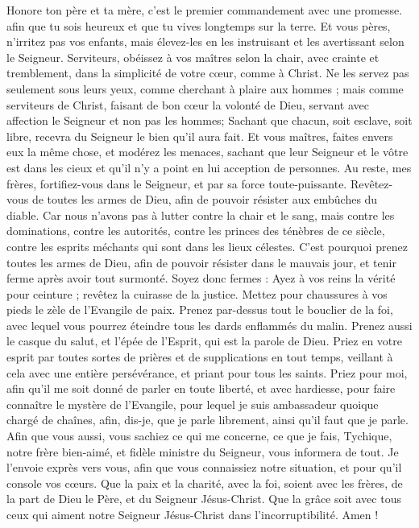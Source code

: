 \begin{multicols}{2}
Honore ton père et ta mère, c'est le premier commandement avec une promesse.
afin que tu sois heureux et que tu vives longtemps sur la terre.
Et vous pères, n'irritez pas vos enfants, mais élevez-les en les instruisant et les avertissant selon le Seigneur.
Serviteurs, obéissez à vos maîtres selon la chair, avec crainte et tremblement, dans la simplicité de votre cœur, comme à Christ.
Ne les servez pas seulement sous leurs yeux, comme cherchant à plaire aux hommes ; mais comme serviteurs de Christ, faisant de bon cœur la volonté de Dieu,
servant avec affection le Seigneur et non pas les hommes;
Sachant que chacun, soit esclave, soit libre, recevra du Seigneur le bien qu'il aura fait.
Et vous maîtres, faites envers eux la même chose, et modérez les menaces, sachant que leur Seigneur et le vôtre est dans les cieux et qu'il n'y a point en lui acception de personnes.
Au reste, mes frères, fortifiez-vous dans le Seigneur, et par sa force toute-puissante.
Revêtez-vous de toutes les armes de Dieu, afin de pouvoir résister aux embûches du diable.
Car nous n'avons pas à lutter contre la chair et le sang, mais contre les dominations, contre les autorités, contre les princes des ténèbres de ce siècle, contre les esprits méchants qui sont dans les lieux célestes.
C'est pourquoi prenez toutes les armes de Dieu, afin de pouvoir résister dans le mauvais jour, et tenir ferme après avoir tout surmonté.
Soyez donc fermes : Ayez à vos reins la vérité pour ceinture ; revêtez la cuirasse de la justice.
Mettez pour chaussures à vos pieds le zèle de l'Evangile de paix.
Prenez par-dessus tout le bouclier de la foi, avec lequel vous pourrez éteindre tous les dards enflammés du malin.
Prenez aussi le casque du salut, et l'épée de l'Esprit, qui est la parole de Dieu.
Priez en votre esprit par toutes sortes de prières et de supplications en tout temps, veillant à cela avec une entière persévérance, et priant pour tous les saints. 
Priez pour moi, afin qu'il me soit donné de parler en toute liberté, et avec hardiesse, pour faire connaître le mystère de l'Evangile,
pour lequel je suis ambassadeur quoique chargé de chaînes, afin, dis-je, que je parle librement, ainsi qu'il faut que je parle.
Afin que vous aussi, vous sachiez ce qui me concerne, ce que je fais, Tychique, notre frère bien-aimé, et fidèle ministre du Seigneur, vous informera de tout.
Je l'envoie exprès vers vous, afin que vous connaissiez notre situation, et pour qu'il console vos cœurs.
Que la paix et la charité, avec la foi, soient avec les frères, de la part de Dieu le Père, et du Seigneur Jésus-Christ.
Que la grâce soit avec tous ceux qui aiment notre Seigneur Jésus-Christ dans l'incorruptibilité. Amen !
\PPE{}
\end{multicols}
